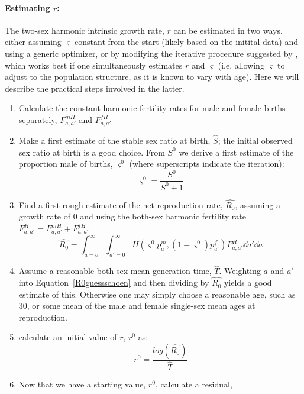 \paragraph{Estimating $r$: } The two-sex harmonic intrinsic growth rate, $r$ can
be estimated in two ways, either assuming $\varsigma$ constant from the start
(likely based on the initital data) and using a generic optimizer, or by modifying the iterative procedure
suggested by \citet{coale1957new}, which works best if one simultaneously
estimates $r$ and $\varsigma$ (i.e. allowing $\varsigma$ to adjust to the
population structure, as it is known to vary with age). Here we will describe
the practical steps involved in the latter.

\begin{enumerate}
  \item Calculate the constant harmonic fertility rates for male and female
  births separately, $F_{a,a'}^{mH}$ and $F_{a,a'}^{fH}$
  \item Make a first estimate of the stable sex ratio at birth, $\hat{S}$; the
  initial observed sex ratio at birth is a good choice. From $S^0$ we derive a
  first estimate of the proportion male of births, $\varsigma^0$ (where
  superscripts indicate the iteration):
  \begin{equation}
  \varsigma^0 = \frac{S^0}{S^0+1}
  \end{equation}
  \item Find a first rough estimate of the net reproduction rate,
  $\widehat{R_0}$, assuming a growth rate of 0 and using the both-sex
  harmonic fertility rate $F_{a,a'}^{H} = F_{a,a'}^{mH} + F_{a,a'}^{fH}$:
  \begin{equation}
  \label{R0guessschoen}
  \widehat{R_0} = \int_{a=o}^\infty \int_{a'=0}^\infty H(\varsigma^0 p_a^m,
  (1-\varsigma^0)p_{a'}^f) F_{a,a'}^{H} \dd a' \dd a
  \end{equation}
  \item Assume a reasonable both-sex mean generation time, $\widehat{T}$.
  Weighting $a$ and $a'$ into Equation~\eqref{R0guessschoen} and then dividing
  by $\widehat{R_0}$ yields a good estimate of this. Otherwise one may simply
  choose a reasonable age, such as 30, or some mean of the male and female
  single-sex mean ages at reproduction.
  \item calculate an initial value of $r$, $r^0$ as:
  \begin{equation}
  r^0 = \frac{log(\widehat{R_0})}{\widehat{T}}
  \end{equation}
  \item Now that we have a starting value, $r^0$, calculate a residual,

\end{enumerate}

